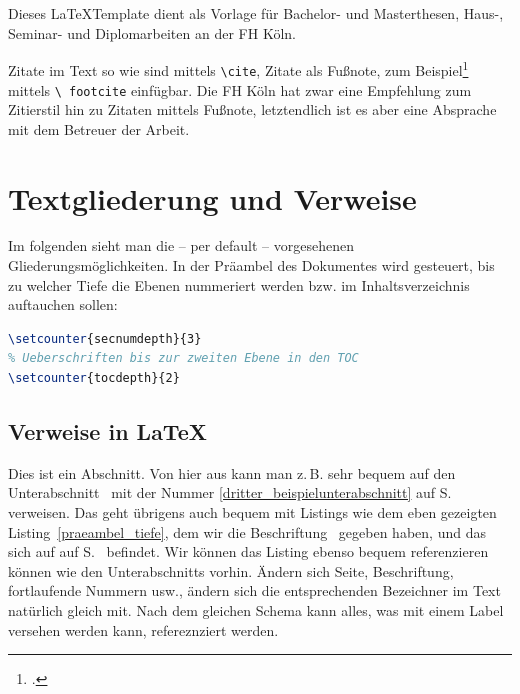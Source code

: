 \documentclass[12pt,oneside,a4paper,bibtotoc,liststotoc]{scrreprt}
\newcommand{\zB}{\mbox{z.\,B.}\xspace}
\begin{document}
Dieses \LaTeX Template dient als Vorlage für Bachelor- und
Masterthesen, Haus-, Seminar- und Diplomarbeiten an der \ac{FH} Köln.

Zitate im Text so wie \cite[vgl.][S.~1]{Lamport} sind mittels
\texttt{\textbackslash cite}, Zitate als Fußnote, zum
Beispiel\footcite[vgl.][S.~1]{Lamport} mittels \texttt{\textbackslash
  footcite} einfügbar. Die \ac{FH} Köln hat zwar eine Empfehlung zum
Zitierstil hin zu Zitaten mittels Fußnote, letztendlich ist es aber
eine Absprache mit dem Betreuer der Arbeit.

\chapter{Textgliederung und Verweise}

Im folgenden sieht man die -- per default -- vorgesehenen
Gliederungsmöglichkeiten. In der Präambel des Dokumentes wird
gesteuert, bis zu welcher Tiefe die Ebenen nummeriert werden bzw. im
Inhaltsverzeichnis auftauchen sollen:

\begin{lstlisting}[language=TeX,caption=Steuerung der
  Nummerierungstiefe und Inhaltsverzeichnistiefe in der
  Prämbel,label=praeambel_tiefe]
% Ueberschriften bis zur dritten Ebene durchnummerieren
\setcounter{secnumdepth}{3}
% Ueberschriften bis zur zweiten Ebene in den TOC
\setcounter{tocdepth}{2}
\end{lstlisting}

\section{Verweise in \LaTeX}

Dies ist ein Abschnitt. Von hier aus kann man \zB sehr bequem auf den
Unterabschnitt \glqq {}\grqq\
mit der Nummer \ref{dritter_beispielunterabschnitt} auf
S.~\pageref{dritter_beispielunterabschnitt} verweisen. Das geht
übrigens auch bequem mit Listings wie dem eben gezeigten
Listing~\ref{praeambel_tiefe}, dem wir die Beschriftung \glqq
{}\grqq\ gegeben haben, und das sich auf auf
S.~\pageref{praeambel_tiefe} befindet. Wir können das Listing ebenso
bequem referenzieren können wie den Unterabschnitts vorhin. Ändern
sich Seite, Beschriftung, fortlaufende Nummern usw., ändern sich die
entsprechenden Bezeichner im Text natürlich gleich mit. Nach dem
gleichen Schema kann alles, was mit einem Label versehen werden kann,
refereznziert werden.
\end{document}
